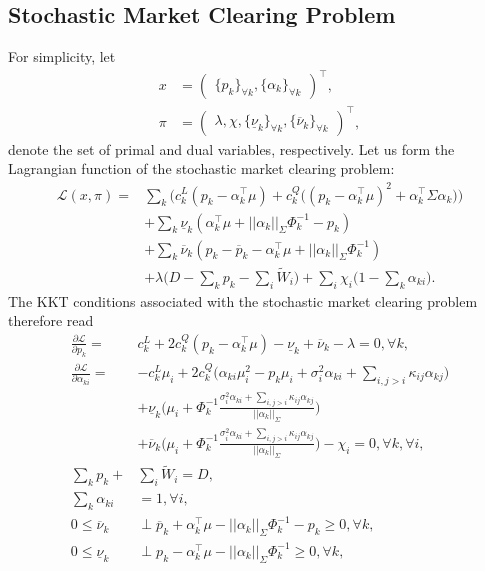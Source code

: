 \documentclass{article}
\begin{document}
\subsection*{Stochastic Market Clearing Problem}
For simplicity, let 
\begin{align*}
x &= \begin{pmatrix} \{p_k\}_{\forall k}, \{\alpha_k\}_{\forall k} \end{pmatrix}^\top,\\
\pi &= \begin{pmatrix} \lambda, \chi, \{\underline{\nu}_k\}_{\forall k}, \{\overline{\nu}_k\}_{\forall k} \end{pmatrix}^\top,
\end{align*}
denote the set of primal and dual variables, respectively. Let us form the Lagrangian function of the stochastic market clearing problem:
\begin{align*}
\mathcal{L}(x, \pi) =& \sum_k \Big(c_k^L(p_k - \alpha_k^\top \mu) + c_k^Q \big((p_k - \alpha_k^\top \mu)^2 + \alpha_k^\top \Sigma \alpha_k\big)\Big)\\
&+ \sum_k \underline{\nu}_k(\alpha_k^\top \mu + ||\alpha_k||_{\Sigma} \Phi_k^{-1} - p_k)\\
&+ \sum_k \overline{\nu}_k (p_k - \overline{p}_k - \alpha_k^\top \mu + ||\alpha_k||_{\Sigma} \Phi_k^{-1})\\
&+ \lambda\big(D - \sum_k p_k - \sum_i \tilde{W}_i\big) + \sum_i \chi_i \big(1 - \sum_k \alpha_{ki}\big).
\end{align*}
The KKT conditions associated with the stochastic market clearing problem therefore read
\begin{align*}
\frac{\partial \mathcal{L}}{\partial p_k} =& c_k^L + 2 c_k^Q (p_k - \alpha_k^\top \mu) - \underline{\nu}_k + \overline{\nu}_k - \lambda = 0, \forall k,\\
\frac{\partial \mathcal{L}}{\partial \alpha_{ki}} =& - c_k^L \mu_i + 2 c_k^Q\Big(\alpha_{ki} \mu_i^2 - p_k \mu_i + \sigma_i^2 \alpha_{ki} + \sum_{i, j>i} \kappa_{ij} \alpha_{kj}\Big)\\
&+ \underline{\nu}_k \Big(\mu_i + \Phi_k^{-1} \frac{\sigma_i^2 \alpha_{ki} + \sum_{i, j>i} \kappa_{ij} \alpha_{kj}}{||\alpha_k||_{\Sigma}}\Big)\\
&+ \overline{\nu}_k \Big(\mu_i + \Phi_k^{-1} \frac{\sigma_i^2 \alpha_{ki} + \sum_{i, j>i} \kappa_{ij} \alpha_{kj}}{||\alpha_k||_{\Sigma}}\Big) - \chi_i = 0, \forall k, \forall i,\\
\sum_k p_k +& \sum_i \tilde{W}_i = D,\\
\sum_k \alpha_{ki} &= 1, \forall i,\\
0 \le \overline{\nu}_k &\perp \overline{p}_k + \alpha_k^\top \mu - ||\alpha_k||_{\Sigma} \Phi_k^{-1} - p_k \ge 0, \forall k,\\
0 \le \underline{\nu}_k & \perp p_k - \alpha_k^\top \mu - ||\alpha_k||_{\Sigma}\Phi_k^{-1} \ge 0, \forall k,
\end{align*}
\end{document}
